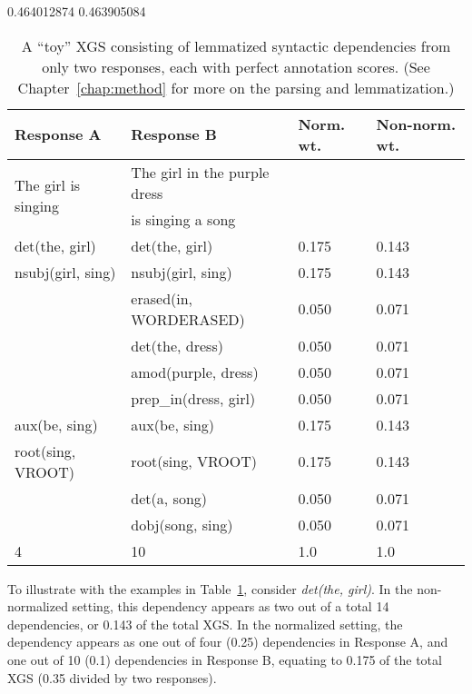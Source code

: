 0.464012874
0.463905084

\begin{table}[htb!]
\begin{center}
\begin{tabular}{|l|l|l|l|}
\hline
Response A & Response B & Norm. wt. & Non-norm. wt.\\
\hline
\multirow{2}{*}{The girl is singing} & The girl in the purple dress & & \\
& is singing a song & & \\
\hline
\hline
det(the, girl) & det(the, girl) & 0.175 & 0.143 \\
\hline
nsubj(girl, sing) & nsubj(girl, sing) & 0.175 & 0.143 \\
\hline
& erased(in, WORDERASED) & 0.050 & 0.071 \\
\hline
& det(the, dress) & 0.050 & 0.071 \\
\hline
& amod(purple, dress) & 0.050 & 0.071 \\
\hline
& prep\_in(dress, girl) & 0.050 & 0.071 \\
\hline
aux(be, sing) & aux(be, sing) & 0.175 & 0.143 \\
\hline
root(sing, VROOT) & root(sing, VROOT) & 0.175 & 0.143 \\
\hline
& det(a, song) & 0.050 & 0.071 \\
\hline
& dobj(song, sing) & 0.050 & 0.071 \\
\hline
\hline
4 & 10 & 1.0 & 1.0 \\
\hline
\end{tabular}
\caption{\label{tab:normalize-responses-deps} A ``toy'' XGS consisting of lemmatized syntactic dependencies from only two responses, each with perfect annotation scores. (See Chapter~\ref{chap:method} for more on the parsing and lemmatization.)}
\end{center}
\end{table}

To illustrate with the examples in Table~\ref{tab:normalize-responses-deps}, consider \textit{det(the, girl)}. In the non-normalized setting, this dependency appears as two out of a total 14 dependencies, or 0.143 of the total XGS. In the normalized setting, the dependency appears as one out of four (0.25) dependencies in Response A, and one out of 10 (0.1) dependencies in Response B, equating to 0.175 of the total XGS (0.35 divided by two responses).

